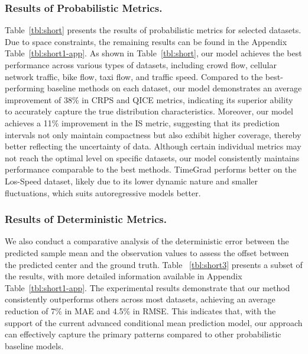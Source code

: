 \subsubsection*{\textbf{Results of Probabilistic Metrics.}}
Table~\ref{tbl:short} presents the results of probabilistic metrics for selected datasets. Due to space constraints, the remaining results can be found in the Appendix Table~\ref{tbl:short1-app}. As shown in Table~\ref{tbl:short}, our model achieves the best performance across various types of datasets, including crowd flow, cellular network traffic, bike flow, taxi flow, and traffic speed. Compared to the best-performing baseline methods on each dataset, our model demonstrates an average improvement of 38\% in CRPS and QICE metrics, indicating its superior ability to accurately capture the true distribution characteristics. Moreover, our model achieves a 11\% improvement in the IS metric, suggesting that its prediction intervals not only maintain compactness but also exhibit higher coverage, thereby better reflecting the uncertainty of data. Although certain individual metrics may not reach the optimal level on specific datasets, our model consistently maintains performance comparable to the best methods. TimeGrad performs better on the Los-Speed dataset, likely due to its lower dynamic nature and smaller fluctuations, which suits autoregressive models better.




\subsubsection*{\textbf{Results of Deterministic Metrics.}}
We also conduct a comparative analysis of the deterministic error between the predicted sample mean and the observation values to assess the offset between the predicted center and the ground truth. Table ~\ref{tbl:short3} presents a subset of the results, with more detailed information available in Appendix Table~\ref{tbl:short1-app}. The experimental results demonstrate that our method consistently outperforms others across most datasets, achieving an average reduction of 7\% in MAE and 4.5\% in RMSE. This indicates that, with the support of the current advanced conditional mean prediction model, our approach can effectively capture the primary patterns compared to other probabilistic baseline models.



